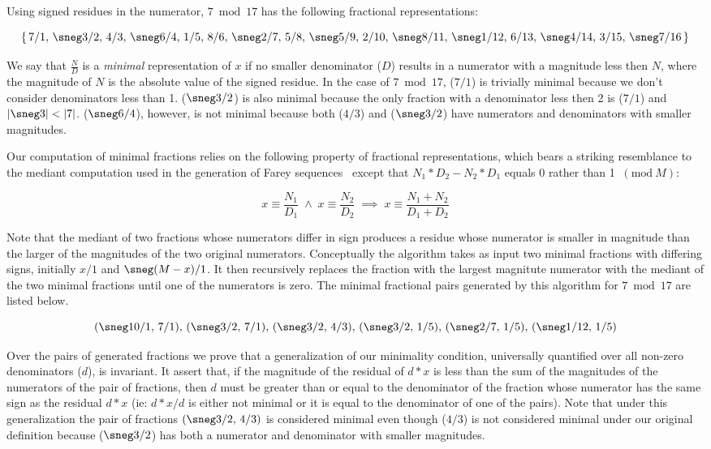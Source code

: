 \documentclass[submission,copyright,creativecommons]{eptcs}
\newcommand{\Mod}[1]{\ (\mathrm{mod}\ #1)}
\begin{document}
Using signed residues in the numerator, $7 \bmod 17$ has the
following fractional representations:

\[
\{
\,7/1,\,\sneg3/2,\,4/3,\,\sneg6/4,\,1/5,\,8/6,\,\sneg2/7,\,5/8,\,\sneg5/9,\,2/10,\,\sneg8/11,\,\sneg1/12,\,6/13,\,\sneg4/14,\,3/15,\,\sneg7/16\,
\}
\]

We say that $\frac{N}{D}$ is a \emph{minimal} representation of $x$ if
no smaller denominator ($D$) results in a numerator with a magnitude
less then $N$, where the magnitude of $N$ is the absolute value
of the signed residue.
In the case of $7 \bmod 17$, ($7/1$) is trivially minimal because we
don't consider denominators less than 1.  ($\sneg3/2$) is also minimal because
the only fraction with a denominator less then 2 is ($7/1$) and 
$\lvert \sneg3 \rvert < \lvert 7\rvert$. 
($\sneg6/4$), however, is not minimal because both ($4/3$)
and ($\sneg3/2$) have numerators and denominators with smaller magnitudes.

Our computation of minimal fractions relies on the following property
of fractional representations, which bears a striking resemblance to
the mediant computation used in the generation of Farey sequences~\cite{Farey}
except that $N_1*D_2 - N_2*D_1$ equals 0 rather than 1 $\Mod{M}$:

\begin{equation*}
x \equiv \frac{N_1}{D_1} \; \land \;
x \equiv \frac{N_2}{D_2} \; \implies \;
x \equiv \frac{N_1 + N_2}{D_1 + D_2}
\end{equation*}

Note that the mediant of two fractions whose numerators differ in sign
produces a residue whose numerator is smaller in magnitude than the
larger of the magnitudes of the two original numerators.  Conceptually
the algorithm takes as input two minimal fractions with differing
signs, initially $x/1$ and $\sneg(M-x)/1$.  It then recursively replaces
the fraction with the largest magnitute numerator with the mediant of
the two minimal fractions until one of the numerators is zero.  The
minimal fractional pairs generated by this algorithm for $7 \bmod 17$
are listed below.

\[
(\sneg10/1,\,7/1),\,(\sneg3/2,\,7/1),\,(\sneg3/2,\,4/3),\,(\sneg3/2,\,1/5),\,(\sneg2/7,\,1/5),\,(\sneg1/12,\,1/5)
\]

Over the pairs of generated fractions we prove that a generalization
of our minimality condition, universally quantified over all non-zero
denominators ($d$), is invariant.  It assert that, if the magnitude of
the residual of $d*x$ is less than the sum of the magnitudes of the
numerators of the pair of fractions, then $d$ must be greater than or
equal to the denominator of the fraction whose numerator has the same
sign as the residual $d*x$ (ie: $d*x/d$ is either not minimal or it is
equal to the denominator of one of the pairs).  Note that under this
generalization the pair of fractions $(\sneg3/2,\,4/3)$ is considered
minimal even though ($4/3$) is not considered minimal under our original
definition because ($\sneg3/2$) has both a numerator and denominator
with smaller magnitudes.
\end{document}
